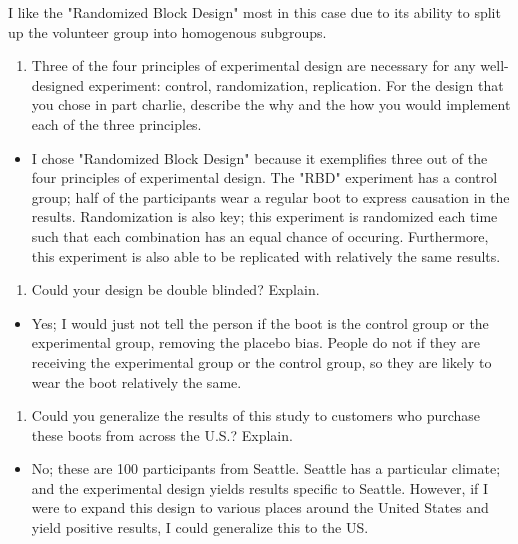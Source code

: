 \documentclass[letterpaper]{article}
\def\tightlist{}
\begin{document}
I like the "Randomized Block Design" most in this case due to its ability to split up the volunteer group into homogenous subgroups.

\begin{enumerate}
\def\labelenumi{(\alph{enumi})}
\setcounter{enumi}{3}
\tightlist
\item
  Three of the four principles of experimental design are necessary for any well-designed experiment: control, randomization, replication. For the design that you chose in part charlie, describe the why and the how you would implement each of the three principles.
\end{enumerate}

\begin{itemize}
\tightlist
\item
  I chose "Randomized Block Design" because it exemplifies three out of the four principles of experimental design. The "RBD" experiment has a control group; half of the participants wear a regular boot to express causation in the results. Randomization is also key; this experiment is randomized each time such that each combination has an equal chance of occuring. Furthermore, this experiment is also able to be replicated with relatively the same results.
\end{itemize}

\begin{enumerate}
\def\labelenumi{(\alph{enumi})}
\setcounter{enumi}{4}
\tightlist
\item
  Could your design be double blinded? Explain.
\end{enumerate}

\begin{itemize}
\tightlist
\item
  Yes; I would just not tell the person if the boot is the control group or the experimental group, removing the placebo bias. People do not if they are receiving the experimental group or the control group, so they are likely to wear the boot relatively the same.
\end{itemize}

\begin{enumerate}
\def\labelenumi{(\alph{enumi})}
\setcounter{enumi}{5}
\tightlist
\item
  Could you generalize the results of this study to customers who purchase these boots from across the U.S.? Explain.
\end{enumerate}

\begin{itemize}
\tightlist
\item
  No; these are 100 participants from Seattle. Seattle has a particular climate; and the experimental design yields results specific to Seattle. However, if I were to expand this design to various places around the United States and yield positive results, I could generalize this to the US.
\end{itemize}
\end{document}
